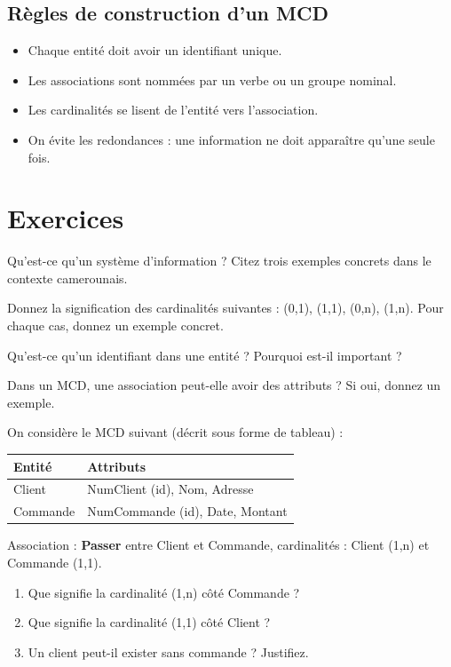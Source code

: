 \subsection*{Règles de construction d'un MCD}
\begin{itemize}
    \item Chaque entité doit avoir un identifiant unique.
    \item Les associations sont nommées par un verbe ou un groupe nominal.
    \item Les cardinalités se lisent de l'entité vers l'association.
    \item On évite les redondances : une information ne doit apparaître qu'une seule fois.
\end{itemize}

\section{Exercices}


\exo{}
Qu'est-ce qu'un système d'information ? Citez trois exemples concrets dans le contexte camerounais.

\exo{}
Donnez la signification des cardinalités suivantes : (0,1), (1,1), (0,n), (1,n). Pour chaque cas, donnez un exemple concret.

\exo{}
Qu'est-ce qu'un identifiant dans une entité ? Pourquoi est-il important ?

\exo{}
Dans un MCD, une association peut-elle avoir des attributs ? Si oui, donnez un exemple.


\exo{}
On considère le MCD suivant (décrit sous forme de tableau) :
\begin{center}
\begin{tabular}{|l|l|}
\hline
\textbf{Entité} & \textbf{Attributs} \\
\hline
Client & NumClient (id), Nom, Adresse \\
\hline
Commande & NumCommande (id), Date, Montant \\
\hline
\end{tabular}
\end{center}
Association : \textbf{Passer} entre Client et Commande, cardinalités : Client (1,n) et Commande (1,1).
\begin{enumerate}
    \item Que signifie la cardinalité (1,n) côté Commande ?
    \item Que signifie la cardinalité (1,1) côté Client ?
    \item Un client peut-il exister sans commande ? Justifiez.
\end{enumerate}

